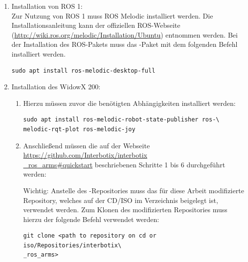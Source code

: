 \begin{enumerate}[label*=\arabic*.]
    \item Installation von ROS 1:\\
    Zur Nutzung von ROS 1 muss ROS Melodic installiert werden. Die Installationsanleitung kann der offiziellen ROS-Webseite (\href{http://wiki.ros.org/melodic/Installation/Ubuntu}{http://wiki.ros.org/melodic/Installation/Ubuntu}) entnommen werden. Bei der Installation des ROS-Pakets muss das -Paket mit dem folgenden Befehl installiert werden.

        \begin{lstlisting}[style=bash]
sudo apt install ros-melodic-desktop-full
        \end{lstlisting}

    \item Installation des WidowX 200:
        \begin{enumerate}[label*=\arabic*.]
            \item Hierzu müssen zuvor die benötigten Abhängigkeiten installiert werden:

                \begin{lstlisting}[style=bash]
sudo apt install ros-melodic-robot-state-publisher ros-\
melodic-rqt-plot ros-melodic-joy
                \end{lstlisting}

            \item Anschließend müssen die auf der Webseite \href{https://github.com/Interbotix/interbotix_ros_arms#quickstart}{https://github.com/Interbotix/interbotix\\\_ros\_arms\#quickstart} beschriebenen Schritte 1 bis 6 durchgeführt werden:

            \begin{redbox}{Wichtig:}
                Anstelle des -Repositories muss das für diese Arbeit modifizierte Repository, welches auf der CD/ISO im Verzeichnis  beigelegt ist, verwendet werden. Zum Klonen des modifizierten Repositories muss hierzu der folgende Befehl verwendet werden:

                \begin{lstlisting}[style=bash]
git clone <path to repository on cd or iso/Repositories/interbotix\
_ros_arms>
                \end{lstlisting}
            \end{redbox}


\end{enumerate}
\end{enumerate}

